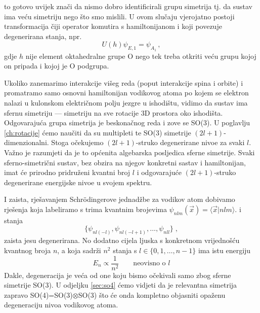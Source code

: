 \begin{primjer}
to gotovo uvijek znači da nismo dobro identificirali grupu simetrija
tj. da sustav ima veću simetriju nego što smo mislili. U ovom slučaju
vjerojatno postoji transformacija čiji operator komutira s hamiltonijanom i
koji povezuje degenerirana stanja, npr.
\begin{displaymath}
 U(h) \psi_{E,1} = \psi_{A_1} \,,
\end{displaymath}
gdje $h$ nije element oktahedralne grupe O nego tek treba otkriti veću grupu kojoj
on pripada i kojoj je O podgrupa.

\end{primjer}


\begin{primjer}


Ukoliko zanemarimo interakcije višeg reda (poput interakcije spina i orbite) i
promatramo samo osnovni hamiltonijan vodikovog atoma po kojem se elektron nalazi u kulonskom 
električnom polju jezgre u ishodištu, vidimo da sustav ima sfernu simetriju --- simetriju
na sve rotacije 3D prostora oko ishodišta. Odgovarajuća grupa simetrija je
beskonačnog reda i zove se SO(3).
U poglavlju \ref{ch:rotacije} ćemo naučiti da su multipleti te SO(3)
simetrije $(2l+1)$-dimenzionalni.
Stoga očekujemo $(2l+1)$-struko degenerirane nivoe za svaki $l$. 
Važno je razumjeti da je to općenita algebarska posljedica sferne simetrije.
Svaki sferno-simetrični sustav, bez obzira na njegov konkretni sastav
i hamiltonijan, imat će prirodno pridruženi kvantni broj $l$
i odgovarajuće $(2l+1)$-struko degenerirane energijske nivoe u svojem spektru.

I zaista, rješavanjem Schr\"{o}dingerove jednadžbe za vodikov atom
dobivamo rješenja koja labeliramo
s trima kvantnim brojevima  $\psi_{nlm}(\vec{x}) = \langle \vec{x} | nlm \rangle$. 
i stanja
\begin{displaymath}
   \{ \psi_{nl(-l)}, \psi_{nl(-l+1)}, \ldots, \psi_{nll}\} \;,
\end{displaymath}
zaista jesu degenerirana.
No dodatno cijela ljuska s konkretnom vrijednošću kvantnog broja $n$, a
koja sadrži $n^2$ stanja s $l \in \{0, 1, \ldots, n-1\}$
ima istu energiju
\begin{displaymath}
  E_n \propto \frac{1}{n^2} \qquad \text{neovisno o $l$}
\end{displaymath}
Dakle, degeneracija je veća od one koju bismo očekivali samo zbog
sferne simetrije SO(3).
U odjeljku \ref{sec:so4}  ćemo vidjeti da je relevantna simetrija
zapravo SO(4)=SO(3)$\otimes$SO(3) što će onda kompletno objasniti
opaženu degeneraciju nivoa vodikovog atoma.
\end{primjer}

